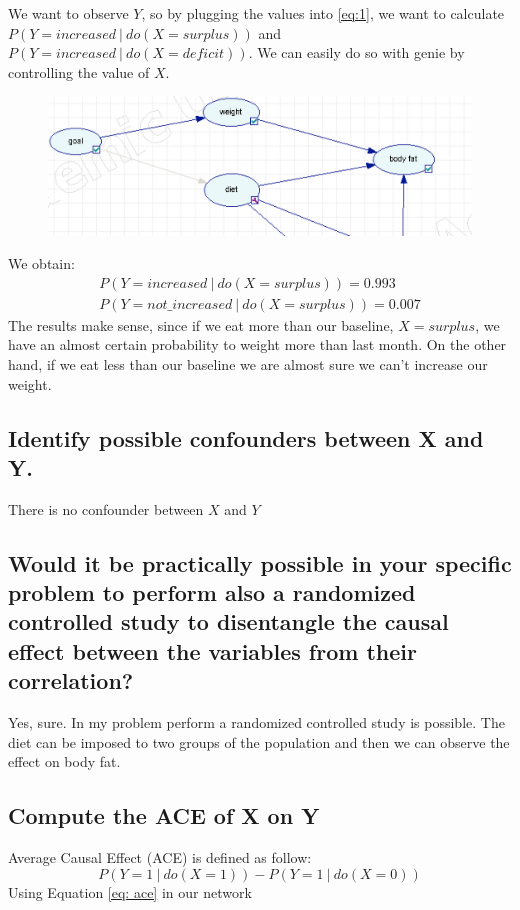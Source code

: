 \documentclass[11pt]{article}
\newcommand\given[1][]{\:#1\vert\:}
\begin{document}
We want to observe $Y$, so by plugging the values into \ref{eq:1}, we want to calculate
$P(Y=increased \given do(X=surplus))$ and $P(Y=increased \given do(X=deficit))$. We can easily do so with genie by controlling the value of $X$.

\begin{figure}[H]
\includegraphics[width=\textwidth]{images/control_value/1}
\end{figure}
We obtain:
\begin{align}
P(Y=increased \given do(X=surplus)) = 0.993 \\
P(Y=not\_increased \given do(X=surplus)) = 0.007
\end{align}
The results make sense, since if we eat more than our baseline, $X=surplus$, we have an almost certain probability to weight more than last month. On the other hand, if we eat less than our baseline we are almost sure we can't increase our weight.

\subsection{Identify possible confounders between X and Y.}
There is no confounder between $X$ and $Y$
\subsection{Would it be practically possible in your specific problem to perform also a randomized controlled study to disentangle the causal effect between the variables from their correlation?
}
Yes, sure. In my problem perform a randomized controlled study is possible. The diet can be imposed to two groups of the population and then we can observe the effect on body fat.

\subsection{Compute the ACE of X on Y}
Average Causal Effect (ACE) is defined as follow:
\begin{equation}
P(Y=1 \given do(X=1)) - P(Y=1 \given do(X=0)) 
\label{eq: ace}
\end{equation}
Using Equation \ref{eq: ace} in our network
\end{document}
